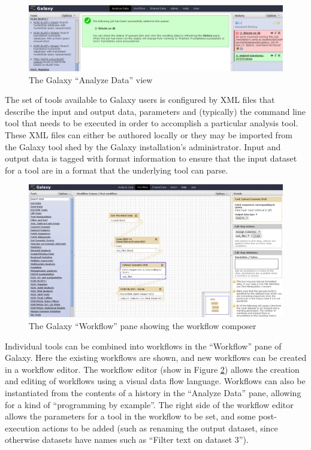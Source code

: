 \documentclass[a4paper,10pt]{scrreprt}
\begin{document}
\begin{figure}[h]
\centering
\includegraphics[width=\textwidth]{images/GalaxyAnalysisScreenshot}
\caption{The Galaxy ``Analyze Data'' view}
\label{fig:GalaxyAnalysisScreenshot}
\end{figure}

The set of tools available to Galaxy users is configured by XML files that describe the input and output data, parameters and (typically) the command line tool that needs to be executed in order to accomplish a particular analysis tool. These XML files can either be authored locally or they may be imported from the Galaxy tool shed \cite{the_galaxy_team_galaxy_2011} by the Galaxy installation's administrator. Input and output data is tagged with format information to ensure that the input dataset for a tool are in a format that the underlying tool can parse.

\begin{figure}[h]
\centering
\includegraphics[width=\textwidth]{images/GalaxyWorkflowScreenshot}
\caption{The Galaxy ``Workflow'' pane showing the workflow composer}
\label{fig:GalaxyWorkflowScreenshot}
\end{figure}

Individual tools can be combined into workflows in the ``Workflow'' pane of Galaxy. Here the existing workflows are shown, and new workflows can be created in a workflow editor. The workflow editor (show in Figure \ref{fig:GalaxyWorkflowScreenshot}) allows the creation and editing of workflows using a visual data flow language. Workflows can also be instantiated from the contents of a history in the ``Analyze Data'' pane, allowing for a kind of ``programming by example''. The right side of the workflow editor allows the parameters for a tool in the workflow to be set, and some post-execution actions to be added (such as renaming the output dataset, since otherwise datasets have names such as ``Filter text on dataset 3'').
\end{document}
